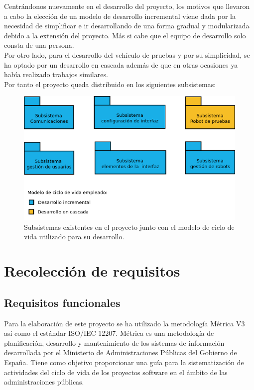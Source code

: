 Centrándonos nuevamente en el desarrollo del proyecto, los motivos que llevaron a cabo la elección de un modelo de desarrollo incremental viene dada por la necesidad de simplificar e ir
desarrollando de una forma gradual y modularizada debido a la extensión del proyecto. Más si cabe que el equipo de desarrollo solo consta de una persona.\\

Por otro lado, para el desarrollo del vehículo de pruebas y por su simplicidad, se ha optado por un desarrollo en cascada además de que en otras ocasiones ya había realizado trabajos similares.\\

Por tanto el proyecto queda distribuido en los siguientes subsistemas:\\

\begin{figure}[H]
  \begin{center}
    \includegraphics[scale=.6]{diagramas/subsistemas.png}
  \end{center}
  \caption{Subsistemas existentes en el proyecto junto con el modelo de ciclo de vida
utilizado para su desarrollo.}
  \label{website:pagina-principal}
\end{figure}


\section{Recolección de requisitos}

\subsection{Requisitos funcionales}

Para la elaboración de este proyecto se ha utilizado la metodología Métrica V3 así como el estándar ISO/IEC 12207. Métrica es una metodología de planificación, desarrollo y
mantenimiento de los sistemas de información desarrollada por el Ministerio de Administraciones Públicas del Gobierno de España. Tiene como objetivo proporcionar una guía para 
la sistematización de actividades del ciclo de vida de los proyectos software en el ámbito de las administraciones públicas.\\

